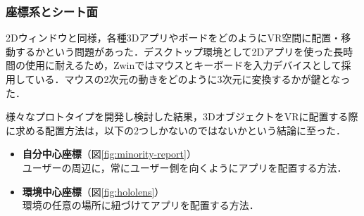 \subsubsection{座標系とシート面}
2Dウィンドウと同様，各種3DアプリやボードをどのようにVR空間に配置・移動するかという問題があった．デスクトップ環境として2Dアプリを使った長時間の使用に耐えるため，Zwinではマウスとキーボードを入力デバイスとして採用している．マウスの2次元の動きをどのように3次元に変換するかが鍵となった．

様々なプロトタイプを開発し検討した結果，3DオブジェクトをVRに配置する際に求める配置方法は，以下の2つしかないのではないかという結論に至った．

\begin{itemize}
  \item \textbf{自分中心座標}（図\ref{fig:minority-report}） \\
        ユーザーの周辺に，常にユーザー側を向くようにアプリを配置する方法．
  \item \textbf{環境中心座標}（図\ref{fig:hololens}） \\
        環境の任意の場所に紐づけてアプリを配置する方法．
\end{itemize}

